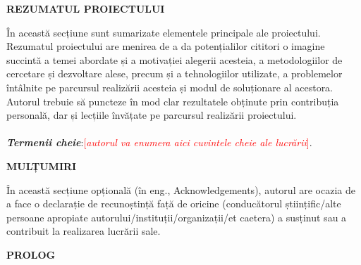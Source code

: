 \newpage

\begin{center}
    \fontsize{16}{11}\selectfont
    \textbf{REZUMATUL PROIECTULUI}
\end{center}

În această secțiune sunt sumarizate elementele principale ale proiectului. Rezumatul proiectului are menirea de a da 
potențialilor cititori o imagine succintă a temei abordate și a motivației alegerii acesteia, a metodologiilor de 
cercetare și dezvoltare alese, precum și a tehnologiilor utilizate, a problemelor întâlnite pe parcursul realizării 
acesteia și modul de soluționare al acestora. Autorul trebuie să puncteze în mod clar rezultatele obținute prin contribuția 
personală, dar și lecțiile învățate pe parcursul realizării proiectului. \\~\\

\textbf{\textit{Termenii cheie}}:\textcolor{red}{[\textit{autorul va enumera aici cuvintele cheie ale lucrării}]}.

\newpage

\begin{center}
    \fontsize{16}{11}\selectfont
    \textbf{MULȚUMIRI}
\end{center}

În această secțiune opțională (în eng., Acknowledgements), autorul are ocazia de a face o declarație de recunoștință 
față de oricine (conducătorul științific/alte persoane apropiate autorului/instituții/organizații/et caetera) a susținut 
sau a contribuit la realizarea lucrării sale.

\newpage

\begin{center}
    \fontsize{16}{11}\selectfont
    \textbf{PROLOG}
\end{center}